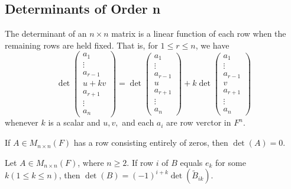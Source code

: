 \subsection{Determinants of Order n}
\begin{theorem}
    The determinant of an \( n \times n \) matrix is a linear function of each row when the remaining rows are held fixed. That is, for \( 1 \leq r \leq n \), we have
    \[
    \det
    \begin{pmatrix}
        a_1 \\
        \vdots \\
        a_{r-1} \\
        u + kv \\
        a_{r+1} \\
        \vdots \\
        a_n
    \end{pmatrix}
    =
    \det
    \begin{pmatrix}
        a_1 \\
        \vdots \\
        a_{r-1} \\
        u \\
        a_{r+1} \\
        \vdots \\
        a_n
    \end{pmatrix}
    + k
    \det
    \begin{pmatrix}
        a_1 \\
        \vdots \\
        a_{r-1} \\
        v \\
        a_{r+1} \\
        \vdots \\
        a_n
    \end{pmatrix}
    \]
    whenever \(k \) is a scalar and \(u, v,\) and each \(a_i\) are row verctor in \(F^n\).
\end{theorem}
\vspace{10cm}
\begin{corollary}
    If \(A \in M_{n \times n}(F)\) has a row consisting entirely of zeros, then \(\det (A) = 0\).
\end{corollary}
\vspace{3cm}
\begin{lemma}
    Let \(A \in M_{n \times n}(F)\), where \( n \geq 2 \). If row \(i\) of \(B\) equals \(e_k\) for some \(k (1\leq k \leq n)\), then \(\det (B) = (-1)^{i+k} \det (\tilde{B}_{ik})\).
\end{lemma}
